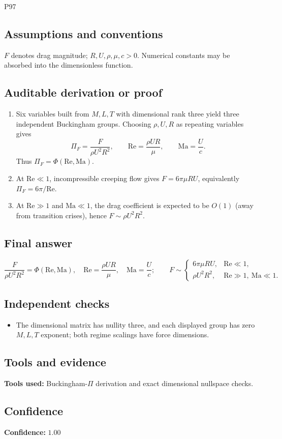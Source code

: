 \documentclass[11pt]{article}
\begin{document}
\begin{mprsolution}{P97}
\subsection*{Assumptions and conventions}
\(F\) denotes drag magnitude; \(R,U,\rho,\mu,c>0\).  Numerical constants may
be absorbed into the dimensionless function.
\subsection*{Auditable derivation or proof}
\begin{enumerate}[label=\textbf{Step \arabic*:},leftmargin=*]
\item Six variables built from \(M,L,T\) with dimensional rank three yield
three independent Buckingham groups.  Choosing \(\rho,U,R\) as repeating
variables gives
\[
\Pi_F=\frac{F}{\rho U^2R^2},\qquad
\mathrm{Re}=\frac{\rho UR}{\mu},\qquad
\mathrm{Ma}=\frac{U}{c}.
\]
Thus \(\Pi_F=\Phi(\mathrm{Re},\mathrm{Ma})\).
\item At \(\mathrm{Re}\ll1\), incompressible creeping flow gives
\(F=6\pi\mu RU\), equivalently \(\Pi_F=6\pi/\mathrm{Re}\).
\item At \(\mathrm{Re}\gg1\) and \(\mathrm{Ma}\ll1\), the drag coefficient is
expected to be \(O(1)\) (away from transition crises), hence
\(F\sim\rho U^2R^2\).
\end{enumerate}
\subsection*{Final answer}
\[
\boxed{\displaystyle
\frac{F}{\rho U^2R^2}
=\Phi\!\left(\mathrm{Re},\mathrm{Ma}\right),\quad
\mathrm{Re}=\frac{\rho UR}{\mu},\quad \mathrm{Ma}=\frac Uc;\qquad
F\sim\begin{cases}6\pi\mu RU,&\mathrm{Re}\ll1,\\
\rho U^2R^2,&\mathrm{Re}\gg1,\ \mathrm{Ma}\ll1.\end{cases}}
\]
\subsection*{Independent checks}
\begin{itemize}[leftmargin=*]
\item The dimensional matrix has nullity three, and each displayed group has
zero \(M,L,T\) exponent; both regime scalings have force dimensions.
\end{itemize}
\subsection*{Tools and evidence}
\textbf{Tools used:} Buckingham-\(\Pi\) derivation and exact dimensional
nullspace checks.
\subsection*{Confidence}
\textbf{Confidence:} \(1.00\)
\end{mprsolution}
\end{document}
